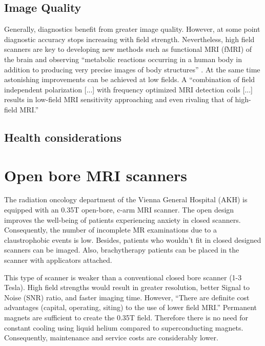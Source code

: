
\subsection{Image Quality}
Generally, diagnostics benefit from greater image quality.
However, at some point diagnostic accuracy stops increasing with field strength.
Nevertheless, high field scanners are key to developing new methods such as functional MRI (fMRI) of the brain \cite{Duyn2012} and observing ``metabolic reactions occurring in a human body in addition to producing very precise images of body structures'' \cite{Wada2010}.
At the same time astonishing improvements can be achieved at low fields.
A ``combination of field independent polarization [...] with frequency optimized MRI detection coils [...] results in low-field MRI sensitivity approaching and even rivaling that of high-field MRI.'' \cite{Coffey2013}

\subsection{Health considerations}


\section{Open bore MRI scanners}

The radiation oncology department of the Vienna General Hospital (AKH) is equipped with an 0.35T open-bore, c-arm MRI scanner.
The open design improves the well-being of patients experiencing anxiety in closed scanners.
Consequently, the number of incomplete MR examinations due to a claustrophobic events is low. \cite{Enders2011a, Bangard2007}
Besides, patients who wouldn't fit in closed designed scanners can be imaged.
Also, brachytherapy patients can be placed in the scanner with applicators attached.

This type of scanner is weaker than a conventional closed bore scanner (1-3 Tesla).
High field strengths would result in greater resolution, better Signal to Noise (SNR) ratio, and faster imaging time.
However, ``There are definite cost advantages (capital, operating, siting) to the use of lower field MRI.'' \cite{Rutt1996}
Permanent magnets are sufficient to create the 0.35T field.
Therefore there is no need for constant cooling using liquid helium compared to superconducting magnets.
Consequently, maintenance and service costs are considerably lower.


